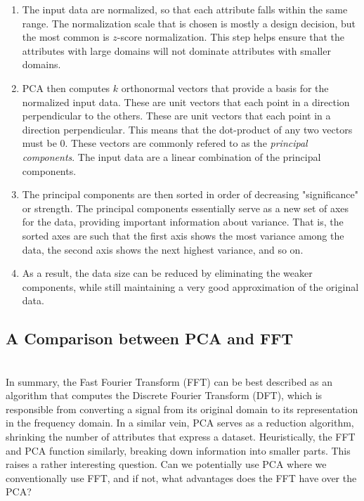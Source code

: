 \documentclass{amsproc}
\begin{document}
\begin{enumerate}
	\item The input data are normalized, so that each attribute falls within the same range. The normalization scale that is chosen is mostly a design decision, but the most common is $z$-score normalization. This step helps ensure that the attributes with large domains will not dominate attributes with smaller domains.
	\item PCA then computes $k$ orthonormal vectors that provide a basis for the normalized input data. These are unit vectors that each point in a direction perpendicular to the others. These are unit vectors that each point in a direction perpendicular. This means that the dot-product of any two vectors must be $0$. These vectors are commonly refered to as the \textit{principal components}. The input data are a linear combination of the principal components.
	\item The principal components are then sorted in order of decreasing "significance" or strength. The principal components essentially serve as a new set of axes for the data, providing important information about variance. That is, the sorted axes are such that the first axis shows the most variance among the data, the second axis shows the next highest variance, and so on.
	\item As a result, the data size can be reduced by eliminating the weaker components, while still maintaining a very good approximation of the original data.

\end{enumerate}

\subsection{A Comparison between PCA and FFT}

\mbox{}	 \\
\indent In summary, the Fast Fourier Transform (FFT) can be best described as an algorithm that computes the Discrete Fourier Transform (DFT), which is responsible from converting a signal from its original domain to its representation in the frequency domain. In a similar vein, PCA serves as a reduction algorithm, shrinking the number of attributes that express a dataset. Heuristically, the FFT and PCA function similarly, breaking down information into smaller parts. This raises a rather interesting question. Can we potentially use PCA where we conventionally use FFT, and if not, what advantages does the FFT have over the PCA?
\end{document}
